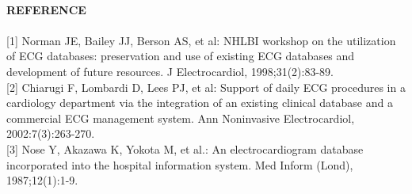 \documentclass[12pt]{article}
\begin{document}
\paragraph{\textbf{REFERENCE}}
\paragraph{} 

[1] Norman JE, Bailey JJ, Berson AS, et al: NHLBI workshop on the utilization of ECG databases: preservation and use of existing ECG databases and development of future resources. J Electrocardiol,
1998;31(2):83-89.\\

[2] Chiarugi F, Lombardi D, Lees PJ, et al: Support of daily
ECG procedures in a cardiology department via the integration of an existing clinical database and a commercial ECG management system. Ann Noninvasive Electrocardiol, 2002:7(3):263-270.\\

[3] Nose Y, Akazawa K, Yokota M, et al.: An electrocardiogram database incorporated into the hospital information system. Med Inform (Lond), 1987;12(1):1-9.
\end{document}
